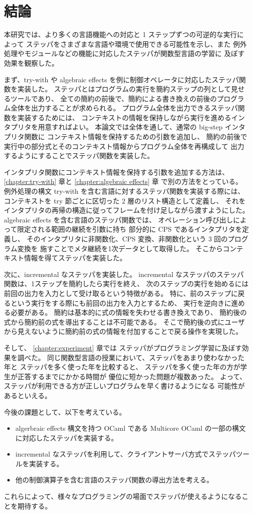 \chapter{結論}
\label{chapter:conclusion}

本研究では、より多くの言語機能への対応と 1 ステップずつの可逆的な実行によって
ステッパをさまざまな言語や環境で使用できる可能性を示し、また
例外処理やモジュールなどの機能に対応したステッパが関数型言語の学習に
及ぼす効果を観察した。

まず、try-with や algebraic effects を例に制御オペレータに対応したステッパ関数を実装した。
ステッパとはプログラムの実行を簡約ステップの列として見せるツールであり、
全ての簡約の前後で、簡約による書き換えの前後のプログラム全体を出力することが求められる。
プログラム全体を出力できるステッパ関数を実装するためには、
コンテキストの情報を保持しながら実行を進めるインタプリタを用意すればよい。
本論文では全体を通して、通常の big-step インタプリタ関数に
コンテキスト情報を保持するための引数を追加し、
簡約の前後で実行中の部分式とそのコンテキスト情報からプログラム全体を再構成して
出力するようにすることでステッパ関数を実装した。

インタプリタ関数にコンテキスト情報を保持する引数を追加する方法は、
\ref{chapter:try-with} 章と \ref{chapter:algebraic effects} 章
で別の方法をとっている。
例外処理の構文 try-with を含む言語に対するステッパ関数を実装する際には、
コンテキストを try 節ごとに区切った 2 層のリスト構造として定義し、
それをインタプリタの再帰の構造に従ってフレームを付け足しながら渡すようにした。
algebraic effects を含む言語のステッパ関数では、
オペレーション呼び出しによって限定される範囲の継続を引数に持ち
部分的に CPS であるインタプリタを定義し、
そのインタプリタに非関数化、CPS 変換、非関数化という 3 回のプログラム変換を
施すことでメタ継続を1次データとして取得した。
そこからコンテキスト情報を得てステッパを実装した。

次に、incremental なステッパを実装した。
incremental なステッパのステッパ関数は、1ステップを簡約したら実行を終え、
次のステップの実行を始めるには前回の出力を入力として受け取るという特徴がある。
特に、前のステップに戻るという実行をする際にも前回の出力を入力とするため、
実行を逆向きに進める必要がある。
簡約は基本的に式の情報を失わせる書き換えであり、
簡約後の式から簡約前の式を導出することは不可能である。
そこで簡約後の式にユーザから見えないように簡約前の式の情報を付加することで戻る操作を実現した。

そして、 \ref{chapter:experiment} 章では
ステッパがプログラミング学習に及ぼす効果を調べた。
同じ関数型言語の授業において、ステッパをあまり使わなかった年と
ステッパを多く使った年を比較すると、
ステッパを多く使った年の方が学生が正答するまでにかかる時間が
優位に短かった問題が複数あった。
よって、ステッパが利用できる方が正しいプログラムを早く書けるようになる
可能性があるといえる。

今後の課題として、以下を考えている。

\begin{itemize}
\item algerbraic effects 構文を持つ OCaml である Multicore OCaml の一部の構文に対応したステッパを実装する。
\item incremental なステッパを利用して、クライアントサーバ方式でステッパツールを実装する。
\item 他の制御演算子を含む言語のステッパ関数の導出方法を考える。
\end{itemize}

\noindent これらによって、様々なプログラミングの場面でステッパが使えるようになることを期待する。
